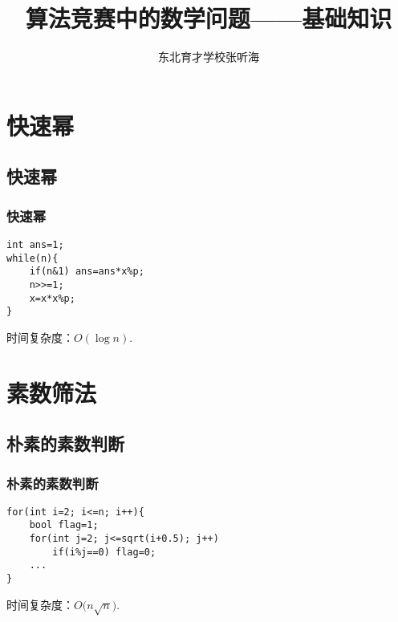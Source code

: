 \documentclass[xcolor=dvipsnames]{beamer}
\title{\xw 算法竞赛中的数学问题——基础知识}
\author{\li 东北育才学校\quad \xk 张听海}
\begin{document}
    \renewcommand{\baselinestretch}{1.25}\normalsize
    \setlength{\parindent}{0em}
    \setlength{\abovedisplayskip}{1pt}
    \setlength{\belowdisplayskip}{1pt}

    \maketitle

    \begin{frame}[shrink]
        \tableofcontents[hideothersubsections]
    \end{frame}

    \section{快速幂}

    \subsection{快速幂}

    \begin{frame}
        \frametitle{快速幂}

        \begin{lstlisting}
int ans=1;
while(n){
    if(n&1) ans=ans*x%p;
    n>>=1;
    x=x*x%p;
}
        \end{lstlisting}\pause

        时间复杂度：\!\!$O(\log n)$.
    \end{frame}

    \section{素数筛法}

    \subsection{朴素的素数判断}

    \begin{frame}
        \frametitle{朴素的素数判断}

        \begin{lstlisting}
for(int i=2; i<=n; i++){
    bool flag=1;
    for(int j=2; j<=sqrt(i+0.5); j++)
        if(i%j==0) flag=0;
    ...
}
        \end{lstlisting}\pause

        时间复杂度：\!\!$O\big(n\sqrt{n}\big)$.
    \end{frame}
\end{document}
